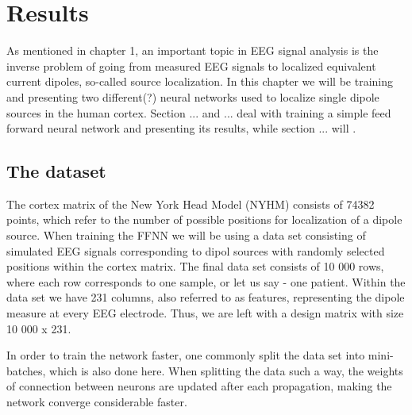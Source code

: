 \documentclass[a4paper, UKenglish, 11pt]{uiomaster}
\begin{document}
\chapter{Results}
As mentioned in chapter 1, an important topic in EEG signal analysis is the inverse problem of going from measured EEG signals to localized equivalent current dipoles, so-called source localization. In this chapter we will be training and presenting two different(?) neural networks used to localize single dipole sources in the human cortex. Section ... and ... deal with training a simple feed forward neural network and presenting its results, while section ... will .

\section{The dataset}
The cortex matrix of the New York Head Model (NYHM) consists of 74382 points, which refer to the number of possible positions for localization of a dipole source. When training the FFNN we will be using a data set consisting of simulated EEG signals corresponding to dipol sources with randomly selected positions within the cortex matrix. The final data set consists of 10 000 rows, where each row corresponds to one sample, or let us say - one patient. Within the data set we have 231 columns, also referred to as features, representing the dipole measure at every EEG electrode. Thus, we are left with a design matrix with size 10 000 x 231.



In order to train the network faster, one commonly split the data set into mini-batches, which is also done here. When splitting the data such a way, the weights of connection between neurons are updated after each propagation, making the network converge considerable faster.



\end{document}
